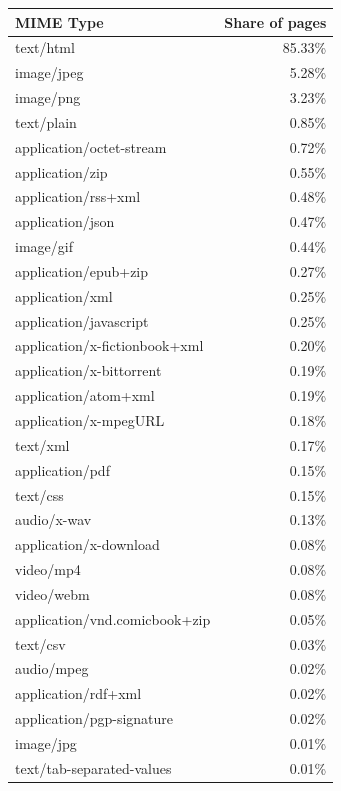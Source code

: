 \documentclass[USenglish,oneside,twocolumn]{article}
\begin{document}
\begin{center}
\label{table:mime types}
\begin{supertabular}[H]{p{5.5cm} | r{2.5cm}}
    \textbf{MIME Type} & \textbf{Share of pages}\\
	\hline
	\hline
	\hline
	text/html			&	85.33\% \\
	\hline
	image/jpeg			&	5.28\% \\
	\hline
	image/png			&	3.23\% \\
	\hline
	text/plain			&	0.85\% \\
	\hline
	application/octet-stream		&	0.72\% \\
	\hline
	application/zip		&	0.55\% \\
	\hline
	application/rss+xml	&	0.48\% \\
	\hline
	application/json	&	0.47\% \\
	\hline
	image/gif			&	0.44\% \\
	\hline
	application/epub+zip			&	0.27\% \\
	\hline
	application/xml		&	0.25\% \\
	\hline
	application/javascript			&	0.25\% \\
	\hline
	application/x-fictionbook+xml	&	0.20\% \\
	\hline
	application/x-bittorrent		&	0.19\% \\
	\hline
	application/atom+xml			&	0.19\% \\
	\hline
	application/x-mpegURL			&	0.18\% \\
	\hline
	text/xml			&	0.17\% \\
	\hline
	application/pdf		&	0.15\% \\
	\hline
	text/css			&	0.15\% \\
	\hline
	audio/x-wav			&	0.13\% \\
	\hline
	application/x-download			&	0.08\% \\
	\hline
	video/mp4			&	0.08\% \\
	\hline
	video/webm			&	0.08\% \\
	\hline
	application/vnd.comicbook+zip	&	0.05\% \\
	\hline
	text/csv			&	0.03\% \\
	\hline
	audio/mpeg			&	0.02\% \\
	\hline
	application/rdf+xml	&	0.02\% \\
	\hline
	application/pgp-signature		&	0.02\% \\
	\hline
	image/jpg			&	0.01\% \\
	\hline
	text/tab-separated-values		&	0.01\% \\

\end{supertabular}
\end{center}
\end{document}
